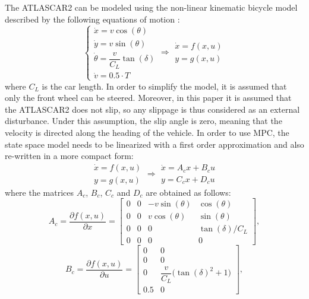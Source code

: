 \documentclass[conference,11pt]{IEEEtran}
\renewcommand{\vec}[1]{\ensuremath{\boldsymbol{\mathit{#1}}}}
\begin{document}
The ATLASCAR2 can be modeled using the non-linear kinematic bicycle model described by the following equations of motion \cite{safety} \cite{swarms}:
\begin{equation*}
\label{eqn:dynamics_model_obstacle_avoidance}
\left \{ \begin{array}{llll}
\dot{x} = v\cos(\theta)\\
\dot{y} = v\sin(\theta)\\
\dot{\theta} =\dfrac{v}{C_L}\tan(\delta)\\
\dot{v} =0.5 \cdot T
\end{array} 
\right .
\Longrightarrow 
\begin{array}{llll}
\dot{\vec{x}} = \vec{f}(\vec{x},\vec{u})\\
\vec{y} = \vec{g}(\vec{x},\vec{u})
\end{array}
\end{equation*}
where $C_L$ is the car length. In order to simplify the model, it is assumed that only the front wheel can be steered. Moreover, in this paper it is assumed that the ATLASCAR2 does not slip, so any slippage is thus considered as an external disturbance. Under this assumption, the slip angle is zero, meaning that the velocity is directed along the heading of the vehicle. In order to use MPC, the state space model needs to be linearized with a first order approximation and also re-written in a more compact form:
\begin{equation}
\label{eqn:dynamics_model_non_linear}
\begin{array}{llll}
\dot{\vec{x}} = \vec{f}(\vec{x},\vec{u})\\
\vec{y} = \vec{g}(\vec{x},\vec{u})
\end{array} \Longrightarrow
\begin{array}{ll}
\dot{\vec{x}} =\vec{A}_c \vec{x}+ \vec{B}_c \vec{u}\\
\vec{y} =\vec{C}_c \vec{x} + \vec{D}_c \vec{u}
\end{array}
\end{equation}
where the matrices $\vec{A}_c$, $\vec{B}_c$, $\vec{C}_c$ and $\vec{D}_c$ are obtained as follows:
\[ 
\vec{A}_c=\frac{\partial \vec{f}(\vec{x},\vec{u})}{\partial \vec{x}}=\begin{bmatrix}
0&0&-v\sin(\theta)&\cos(\theta)\\
0&0&v\cos(\theta)&\sin(\theta)\\
0&0&0&\tan(\delta)/C_L\\
0&0&0&0
\end{bmatrix},
\]
\[
\vec{B}_c=\frac{\partial \vec{f}(\vec{x},\vec{u})}{\partial \vec{u}}=\begin{bmatrix}
0&0\\
0&0\\
0&\dfrac{v}{C_L}\big(\tan(\delta)^2+1\big)\\
0.5&0
\end{bmatrix},
\]
\end{document}
